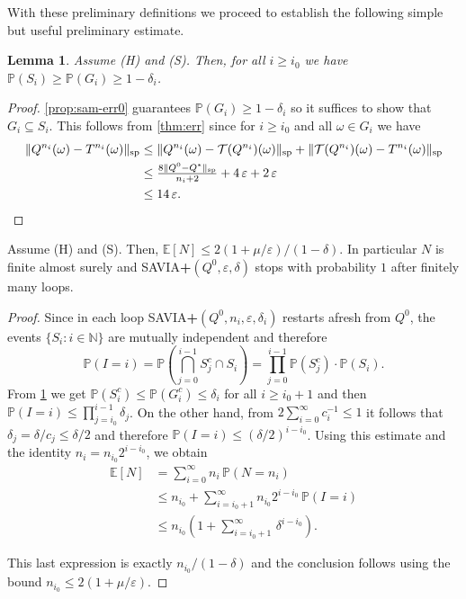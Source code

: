 \documentclass{article}
\newcommand{\expec}{\mathbb{E}}
\newcommand{\prob}{\mathbb{P}}
\newcommand{\T}{\mathcal{T}}
\newcommand{\NN}{\mathbb{N}}
\renewcommand{\sp}[1]{\|{#1}\|_\text{\rm sp}}
\newcommand{\st}{N}
\newenvironment{manualproposition}[1]{%
  \renewcommand\themanualpropinner{#1}%
  \manualpropinner
}{\endmanualpropinner}
\theoremstyle{plain}
\newtheorem{lemma}[theorem]{Lemma}
\theoremstyle{definition}
\theoremstyle{remark}
\begin{document}
With these preliminary definitions we proceed to establish the following simple but useful preliminary estimate.
    \begin{lemma}\label{Le:tres}
       Assume \mbox{\sc (H)} and \mbox{\sc (S)}. Then, for all $i \ge i_0$ we have $\prob (S_{i}) \ge  \prob (G_{i}) \ge 1-\delta_{i}$.
    \end{lemma}
    \begin{proof}
          \cref{prop:sam-err0} guarantees $\prob{(G_i)}\ge 1-\delta_{i}$ so it suffices to show that $G_i \subseteq S_i$. This follows 
from \cref{thm:err} since for $i \ge i_0$ and all $\omega \in G_i$ we have
$$
\begin{aligned}
\sp{Q^{n_i}(\omega)-T^{n_i}(\omega)} &\le \sp{Q^{n_i}(\omega)-\T(Q^{n_i})(\omega)}+\sp{\T(Q^{n_i})(\omega)-T^{n_i}(\omega)}\\
&\le \mbox{$\frac{8\sp{Q^0-Q^*}}{n_i+2}+4\,\varepsilon+2\,\varepsilon$} \\
&\le 14\,\varepsilon.
\end{aligned}
$$

\vspace{-5ex}
    \end{proof}
    
\begin{manualproposition}{\ref{Prop:3.3}}
Assume \mbox{\sc (H)} and \mbox{\sc (S)}. Then, $\expec [N] \le {2(1+\mu/\varepsilon)}/{(1-\delta)}$. In particular $N$ is finite almost surely and \mbox{\rm SAVIA\textbf{+}}$(Q^0,\varepsilon,\delta)$ stops with probability $1$ after finitely many loops.  
\end{manualproposition}
\begin{proof} 
Since in each loop {\rm SAVIA}\textbf{+}$(Q^0,n_i,\varepsilon,\delta_i)$ restarts afresh from $Q^0$, the events $\{S_i:i\in\NN\}$ are mutually independent and therefore
$$\prob(I=i) = \mbox{$\prob(\bigcap^{i-1}_{j=0} S^c_j \cap S_i)= \prod^{i-1}_{j=0}\prob( S^c_j)\cdot \prob( S_i)$}.$$
From \cref{Le:tres} we get $\prob (S^c_{i}) \le  \prob (G^c_{i}) \le\delta_{i}$ for all $i \ge i_0+1$ and then $\prob (I =i) \le \prod^{i-1}_{j=i_0} \delta_j$. On the other hand, from $2
\sum_{i=0}^\infty c_i^{-1}\leq 1$ it follows that
 $\delta_j=\delta/c_j\leq\delta/2$ and therefore
 $\prob (I =i) \le (\delta/2)^{i-i_0}$. Using this estimate 
and the identity $n_i=n_{i_0}2^{i-i_0}$, we obtain
     $$
    \begin{aligned}
    \expec[\st]&= \mbox{$\sum^{\infty}_{i=0}n_i\,\prob(N=n_i)$} \\&\le \mbox{$n_{i_{0}}+ \sum^{\infty}_{i=i_0+1}n_{i_0}2^{i-i_0}\,\prob(I=i)$}\\
    &\leq \mbox{$n_{i_{0}}(1+ \sum^{\infty}_{i=i_0+1} \,\delta^{i-i_0})$}.
        \end{aligned}
$$

\vspace{-1ex}
This last expression is exactly $n_{i_{0}}/(1-\delta)$ and the conclusion follows using the bound $n_{i_{0}}\leq 2(1+\mu/\varepsilon)$.
\end{proof}
\end{document}
